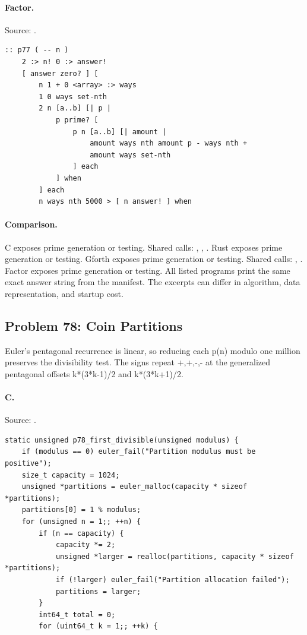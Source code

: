 \paragraph{Factor.} Source: .
\begin{lstlisting}
:: p77 ( -- n )
    2 :> n! 0 :> answer!
    [ answer zero? ] [
        n 1 + 0 <array> :> ways
        1 0 ways set-nth
        2 n [a..b] [| p |
            p prime? [
                p n [a..b] [| amount |
                    amount ways nth amount p - ways nth +
                    amount ways set-nth
                ] each
            ] when
        ] each
        n ways nth 5000 > [ n answer! ] when
\end{lstlisting}

\paragraph{Comparison.}
C exposes prime generation or testing. Shared calls: \texttt{}, \texttt{}, \texttt{}. Rust exposes prime generation or testing. Gforth exposes prime generation or testing. Shared calls: \texttt{}, \texttt{}. Factor exposes prime generation or testing.
All listed programs print the same exact answer string from the manifest. The excerpts can differ in algorithm, data representation, and startup cost.

\subsection{Problem 78: Coin Partitions}
\label{walkthrough:p78}
Euler's pentagonal recurrence is linear, so reducing each p(n) modulo one million preserves the divisibility test. The signs repeat +,+,-,- at the generalized pentagonal offsets k*(3*k-1)/2 and k*(3*k+1)/2.

\paragraph{C.} Source: .
\begin{lstlisting}
static unsigned p78_first_divisible(unsigned modulus) {
    if (modulus == 0) euler_fail("Partition modulus must be positive");
    size_t capacity = 1024;
    unsigned *partitions = euler_malloc(capacity * sizeof *partitions);
    partitions[0] = 1 % modulus;
    for (unsigned n = 1;; ++n) {
        if (n == capacity) {
            capacity *= 2;
            unsigned *larger = realloc(partitions, capacity * sizeof *partitions);
            if (!larger) euler_fail("Partition allocation failed");
            partitions = larger;
        }
        int64_t total = 0;
        for (uint64_t k = 1;; ++k) {
\end{lstlisting}


